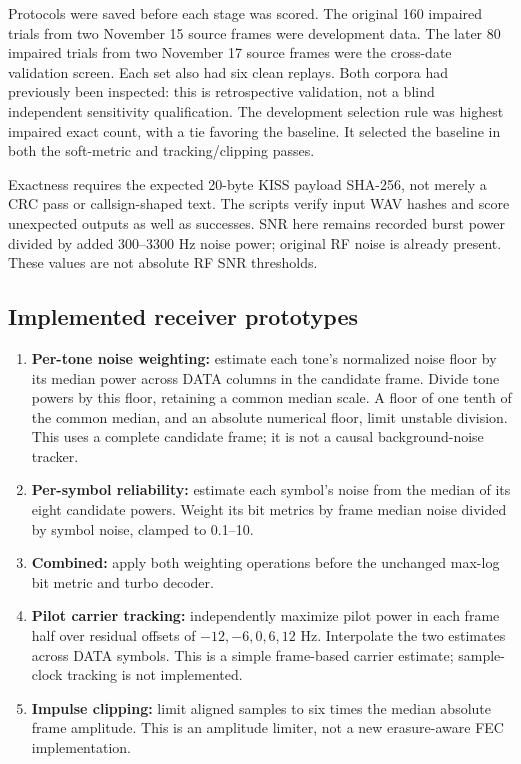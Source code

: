 \documentclass[11pt,a4paper]{article}
\begin{document}
Protocols were saved before each stage was scored. The original 160 impaired
trials from two November 15 source frames were development data. The later
80 impaired trials from two November 17 source frames were the cross-date
validation screen. Each set also had six clean replays. Both corpora had
previously been inspected: this is retrospective validation, not a blind
independent sensitivity qualification. The development selection rule was
highest impaired exact count, with a tie favoring the baseline. It selected
the baseline in both the soft-metric and tracking/clipping passes.

Exactness requires the expected 20-byte KISS payload SHA-256, not merely a
CRC pass or callsign-shaped text. The scripts verify input WAV hashes and
score unexpected outputs as well as successes. SNR here remains recorded
burst power divided by added 300--3300 Hz noise power; original RF noise is
already present. These values are not absolute RF SNR thresholds.

\subsection{Implemented receiver prototypes}
\begin{enumerate}[leftmargin=*]
  \item \textbf{Per-tone noise weighting:} estimate each tone's normalized
        noise floor by its median power across DATA columns in the candidate
        frame. Divide tone powers by this floor, retaining a common median
        scale. A floor of one tenth of the common median, and an absolute
        numerical floor, limit unstable division. This uses a complete
        candidate frame; it is not a causal background-noise tracker.
  \item \textbf{Per-symbol reliability:} estimate each symbol's noise from
        the median of its eight candidate powers. Weight its bit metrics by
        frame median noise divided by symbol noise, clamped to 0.1--10.
  \item \textbf{Combined:} apply both weighting operations before the
        unchanged max-log bit metric and turbo decoder.
  \item \textbf{Pilot carrier tracking:} independently maximize pilot power
        in each frame half over residual offsets of $-12,-6,0,6,12$ Hz.
        Interpolate the two estimates across DATA symbols. This is a simple
        frame-based carrier estimate; sample-clock tracking is not implemented.
  \item \textbf{Impulse clipping:} limit aligned samples to six times the
        median absolute frame amplitude. This is an amplitude limiter, not
        a new erasure-aware FEC implementation.
\end{enumerate}
\end{document}
